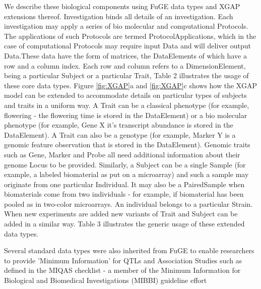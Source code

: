 We describe these biological components using FuGE data types and XGAP extensions thereof. 
Investigation binds all details of an investigation. Each investigation may apply a series 
of bio molecular \cite{Brown:2005} and computational \cite{Carey:2007,Alberts:2008,Fu:2007,Bhave:2007} 
Protocols. The applications of such Protocols are termed ProtocolApplications, which in the case 
of computational Protocols may require 
input Data and will deliver output Data.These data have the form of matrices, the DataElements 
of which have a row and a column index. Each row and column refers to a DimensionElement, 
being a particular Subject or a particular Trait, Table 2 illustrates the usage of these core 
data types. Figure \ref{fig:XGAP}a and \ref{fig:XGAP}c shows how the XGAP model can be extended to accommodate details on 
particular types of subjects and traits in a uniform way. A Trait can be a classical phenotype 
(for example, flowering - the flowering time is stored in the DataElement) or a bio molecular 
phenotype (for example, Gene X it's transcript abundance is stored in the DataElement). A 
Trait can also be a genotype (for example, Marker Y is a genomic feature observation that is 
stored in the DataElement). Genomic traits such as Gene, Marker and Probe all need additional 
information about their genome Locus to be provided. Similarly, a Subject can be a single 
Sample (for example, a labeled biomaterial as put on a microarray) and such a sample may 
originate from one particular Individual. It may also be a PairedSample when biomaterials come 
from two individuals - for example, if biomaterial has been pooled as in two-color microarrays. 
An individual belongs to a particular Strain. When new experiments are added new variants of 
Trait and Subject can be added in a similar way. Table 3 illustrates the generic usage of 
these extended data types.

Several standard data types were also inherited from FuGE to enable researchers to provide 
'Minimum Information' for QTLs and Association Studies such as defined in the MIQAS checklist 
 - a member of the Minimum Information for Biological and Biomedical Investigations (MIBBI) 
guideline effort \cite{Taylor:2008}

